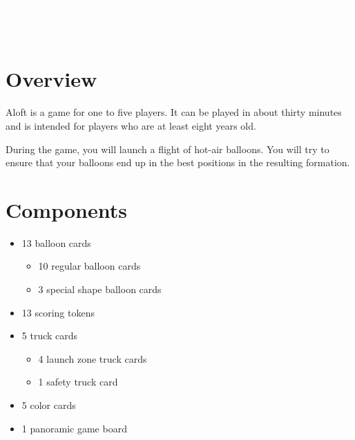 \documentclass[a6paper, 11pt, parskip=half, DIV=15]{scrartcl}
\begin{document}
\begin{titlepage}

\enlargethispage{3.0\baselineskip}
\Huge
\vspace*{-1.0\baselineskip}
{
\setmainfont[Scale=2.2375]{Oi}
\begin{center}
\textcolor{white}{Aloft}
\end{center}
}
\vfill
\huge
\setmainfont[Scale=1.05]{Playball}
\begin{center}
\textcolor{white}{Designed by Michael Purcell}
\end{center}
\end{titlepage}


\ClearShipoutPicture
\enlargethispage{1.75\baselineskip}
\section*{Overview}
Aloft is a game for one to five players. It can be played in about thirty minutes and is intended for players who are at least eight years old.

During the game, you will launch a flight of hot-air balloons. You will try to ensure that your balloons end up in the best positions in the resulting formation.

\section*{Components}
\begin{itemize}[nosep]
  \item 13 balloon cards
    \begin{itemize}[nosep]
      \item 10 regular balloon cards
      \item 3 special shape balloon cards
    \end{itemize}
  \item 13 scoring tokens
  \item 5 truck cards
    \begin{itemize}[nosep]
      \item 4 launch zone truck cards
      \item 1 safety truck card
    \end{itemize}
  \item 5 color cards
  \item 1 panoramic game board
\end{itemize}
\end{document}
